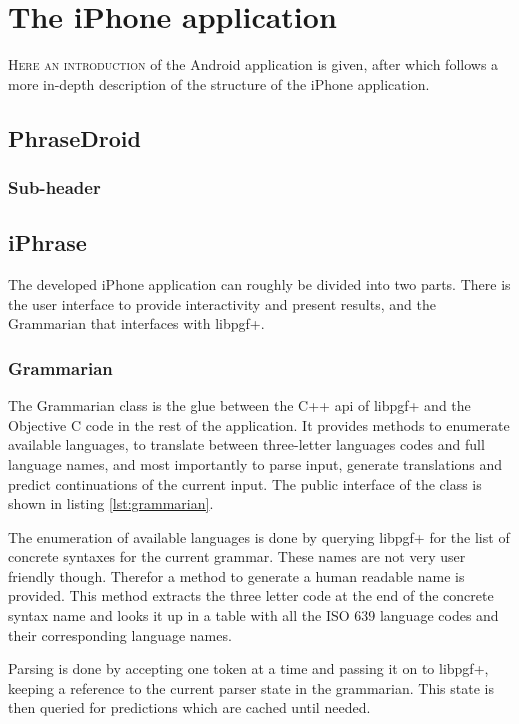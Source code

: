 \chapter{The iPhone application}
\lettrine[lines=4, loversize=-0.1, lraise=0.1]{H}{ere an introduction} of the Android application is given, after which follows a more in-depth description of the structure of the iPhone application.


\section{PhraseDroid}
\subsection{Sub-header}


\section{iPhrase}
The developed iPhone application can roughly be divided into two parts. There is the user interface to provide interactivity and present results, and the Grammarian that interfaces with libpgf+.


\subsection{Grammarian}
\label{sec:grammarian}
The Grammarian class is the glue between the C++ api of libpgf+ and the Objective C code in the rest of the application. It provides methods to enumerate available languages, to translate between three-letter languages codes and full language names, and most importantly to parse input, generate translations and predict continuations of the current input. The public interface of the class is shown in listing \ref{lst:grammarian}.

The enumeration of available languages is done by querying libpgf+ for the list of concrete syntaxes for the current grammar. These names are not very user friendly though. Therefor a method to generate a human readable name is provided. This method extracts the three letter code at the end of the concrete syntax name and looks it up in a table with all the ISO 639 \cite{iso639} language codes and their corresponding language names.

Parsing is done by accepting one token at a time and passing it on to libpgf+, keeping a reference to the current parser state in the grammarian. This state is then queried for predictions which are cached until needed.

